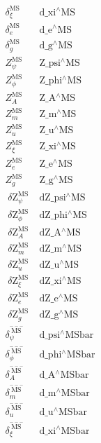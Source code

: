 \documentclass[../FeynCalcManual.tex]{subfiles}
\begin{document}
\begin{dmath*}
\begin{array}{cc}
 \delta _{\xi }^{\text{MS}} & \;\text{d$\_$xi${}^{\wedge}$MS} \\
 \delta _e^{\text{MS}} & \;\text{d$\_$e${}^{\wedge}$MS} \\
 \delta _g^{\text{MS}} & \;\text{d$\_$g${}^{\wedge}$MS} \\
 Z_{\psi }^{\text{MS}} & \;\text{Z$\_$psi${}^{\wedge}$MS} \\
 Z_{\phi }^{\text{MS}} & \;\text{Z$\_$phi${}^{\wedge}$MS} \\
 Z_A^{\text{MS}} & \;\text{Z$\_$A${}^{\wedge}$MS} \\
 Z_m^{\text{MS}} & \;\text{Z$\_$m${}^{\wedge}$MS} \\
 Z_u^{\text{MS}} & \;\text{Z$\_$u${}^{\wedge}$MS} \\
 Z_{\xi }^{\text{MS}} & \;\text{Z$\_$xi${}^{\wedge}$MS} \\
 Z_e^{\text{MS}} & \;\text{Z$\_$e${}^{\wedge}$MS} \\
 Z_g^{\text{MS}} & \;\text{Z$\_$g${}^{\wedge}$MS} \\
 \;\text{$\delta $Z}_{\psi }^{\text{MS}} & \;\text{dZ$\_$psi${}^{\wedge}$MS} \\
 \;\text{$\delta $Z}_{\phi }^{\text{MS}} & \;\text{dZ$\_$phi${}^{\wedge}$MS} \\
 \;\text{$\delta $Z}_A^{\text{MS}} & \;\text{dZ$\_$A${}^{\wedge}$MS} \\
 \;\text{$\delta $Z}_m^{\text{MS}} & \;\text{dZ$\_$m${}^{\wedge}$MS} \\
 \;\text{$\delta $Z}_u^{\text{MS}} & \;\text{dZ$\_$u${}^{\wedge}$MS} \\
 \;\text{$\delta $Z}_{\xi }^{\text{MS}} & \;\text{dZ$\_$xi${}^{\wedge}$MS} \\
 \;\text{$\delta $Z}_e^{\text{MS}} & \;\text{dZ$\_$e${}^{\wedge}$MS} \\
 \;\text{$\delta $Z}_g^{\text{MS}} & \;\text{dZ$\_$g${}^{\wedge}$MS} \\
 \delta _{\psi }^{\overset{---}{\text{MS}}} & \;\text{d$\_$psi${}^{\wedge}$MSbar} \\
 \delta _{\phi }^{\overset{---}{\text{MS}}} & \;\text{d$\_$phi${}^{\wedge}$MSbar} \\
 \delta _A^{\overset{---}{\text{MS}}} & \;\text{d$\_$A${}^{\wedge}$MSbar} \\
 \delta _m^{\overset{---}{\text{MS}}} & \;\text{d$\_$m${}^{\wedge}$MSbar} \\
 \delta _u^{\overset{---}{\text{MS}}} & \;\text{d$\_$u${}^{\wedge}$MSbar} \\
 \delta _{\xi }^{\overset{---}{\text{MS}}} & \;\text{d$\_$xi${}^{\wedge}$MSbar} \\

\end{array}
\end{dmath*}
\end{document}

